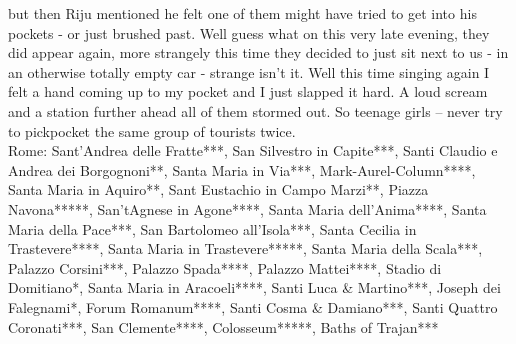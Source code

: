 but then Riju mentioned he felt one of them might have tried to get into his pockets - or just brushed past. Well guess what on this very late evening, they did appear again, more strangely this time they decided to just sit next to us - in an otherwise totally empty car - strange isn't it. Well this time singing again I felt a hand coming up to my pocket and I just slapped it hard. A loud scream and a station further ahead all of them stormed out. So teenage girls -- never try to pickpocket the same group of tourists twice.\\

Rome: Sant'Andrea delle Fratte***,  San Silvestro in Capite***,  Santi Claudio e Andrea dei Borgognoni**,  Santa Maria in Via***,  Mark-Aurel-Column****,  Santa Maria in Aquiro**,  Sant Eustachio in Campo Marzi**,  Piazza Navona*****,  San'tAgnese in Agone****,  Santa Maria dell'Anima****,  Santa Maria della Pace***,  San Bartolomeo all'Isola***,  Santa Cecilia in Trastevere****,  Santa Maria in Trastevere*****,  Santa Maria della Scala***,  Palazzo Corsini***,  Palazzo Spada****,  Palazzo Mattei****,  Stadio di Domitiano*,  Santa Maria in Aracoeli****,  Santi Luca \& Martino***,  Joseph dei Falegnami*,  Forum Romanum****,  Santi Cosma \& Damiano***,  Santi Quattro Coronati***,  San Clemente****,  Colosseum*****,  Baths of Trajan***\\

